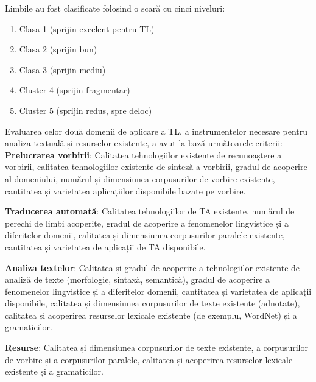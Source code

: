 \documentclass[]{../../metanetpaper}
\begin{document}
\begin{multicols}{2}
Limbile au fost clasificate folosind o scară cu cinci niveluri:
\begin{enumerate}
      \item Clasa 1 (sprijin excelent pentru TL)
      \item Clasa 2 (sprijin bun)
      \item Clasa 3 (sprijin mediu)
      \item Cluster 4 (sprijin fragmentar) 
      \item Cluster 5 (sprijin redus, spre deloc)
\end{enumerate}

Evaluarea celor două domenii de aplicare a TL, a instrumentelor necesare pentru analiza textuală și resurselor existente, a avut la bază următoarele criterii:
\textbf{Prelucrarea vorbirii}: Calitatea tehnologiilor existente de recunoaștere a vorbirii, calitatea tehnologiilor existente de sinteză a vorbirii, gradul de acoperire al domeniului, numărul și dimensiunea corpusurilor de vorbire existente, cantitatea și varietatea aplicațiilor disponibile bazate pe vorbire.

\textbf{Traducerea automată}: Calitatea tehnologiilor de TA existente, numărul de perechi de limbi acoperite, gradul de acoperire a fenomenelor lingvistice și a diferitelor domenii, calitatea și dimensiunea corpusurilor paralele existente, cantitatea și varietatea de aplicații de TA disponibile.

\textbf{Analiza textelor}: Calitatea și gradul de acoperire a tehnologiilor existente de analiză de texte (morfologie, sintaxă, semantică), gradul de acoperire a fenomenelor lingvistice și a diferitelor domenii, cantitatea și varietatea de aplicații disponibile, calitatea și dimensiunea corpusurilor de texte existente (adnotate), calitatea și acoperirea resurselor lexicale existente (de exemplu, WordNet) și a gramaticilor.

\textbf{Resurse}: Calitatea și dimensiunea corpusurilor de texte existente, a corpusurilor de vorbire și a corpusurilor paralele, calitatea și acoperirea resurselor lexicale existente și a gramaticilor.


\end{multicols}
\end{document}
